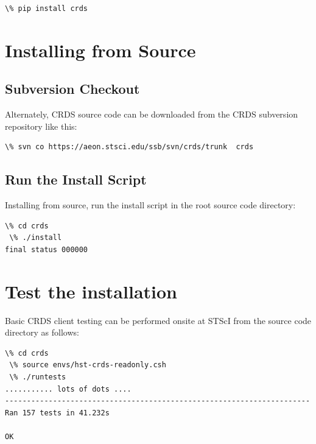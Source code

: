\documentclass[letterpaper,10pt,english]{sphinxmanual}
\begin{document}
\begin{Verbatim}[commandchars=\\\{\}]
\% pip install crds
\end{Verbatim}


\section{Installing from Source}
\label{installation:installing-from-source}

\subsection{Subversion Checkout}
\label{installation:subversion-checkout}
Alternately, CRDS source code can be downloaded from the CRDS subversion repository like this:

\begin{Verbatim}[commandchars=\\\{\}]
\% svn co https://aeon.stsci.edu/ssb/svn/crds/trunk  crds
\end{Verbatim}


\subsection{Run the Install Script}
\label{installation:run-the-install-script}
Installing from source,  run the install script in the root source code directory:

\begin{Verbatim}[commandchars=\\\{\}]
 \% cd crds
 \% ./install
final status 000000
\end{Verbatim}


\section{Test the installation}
\label{installation:test-the-installation}
Basic CRDS client testing can be performed onsite at STScI from the source code directory as follows:

\begin{Verbatim}[commandchars=\\\{\}]
 \% cd crds
 \% source envs/hst-crds-readonly.csh
 \% ./runtests
........... lots of dots ....
----------------------------------------------------------------------
Ran 157 tests in 41.232s

OK
\end{Verbatim}
\end{document}

